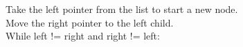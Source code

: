 \documentclass[preview]{standalone}
\begin{document}
Take the left pointer from the list to start a new node.\\Move the right pointer to the left child.\\While left != right and right != left:\\
\end{document}
